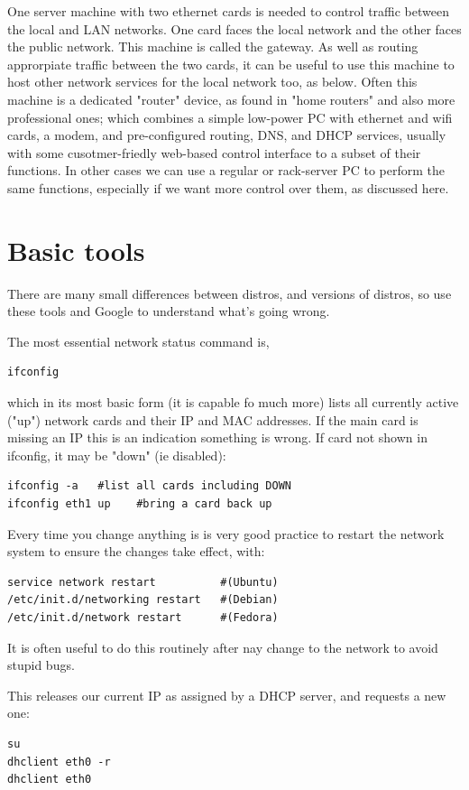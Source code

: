 \documentclass[oneside,english]{scrbook}
\begin{document}
One server machine with two ethernet cards is needed to control traffic
between the local and LAN networks. One card faces the local network and the other faces the public network.  This machine is called the gateway.
As well as routing approrpiate traffic between the two cards, it can be useful to use this machine to host other network services for the local network too, as below.  Often this machine is a dedicated "router" device, as found in "home routers" and also more professional ones; which combines a simple low-power PC with ethernet and wifi cards, a modem, and pre-configured routing, DNS, and DHCP services, usually with some cusotmer-friedly web-based control interface to a subset of their functions. In other cases we can use a regular or rack-server PC to perform the same functions, especially if we want more control over them, as discussed here.

\section{Basic tools}

There are many small differences between distros, and versions of
distros, so use these tools and Google to understand what's going
wrong.

The most essential network status command is,
\begin{lstlisting}
ifconfig
\end{lstlisting}
which in its most basic form (it is capable fo much more) lists all currently active ("up") network cards and their IP and MAC addresses.  If the main card is missing an IP this is an indication something is wrong.  If card not shown in ifconfig, it may be "down" (ie disabled): 
\begin{lstlisting}
ifconfig -a   #list all cards including DOWN 
ifconfig eth1 up    #bring a card back up
\end{lstlisting}

Every time you change anything is is very good practice to restart the network system to ensure the changes take effect, with:

\begin{lstlisting}
service network restart			 #(Ubuntu)
/etc/init.d/networking restart   #(Debian)
/etc/init.d/network restart      #(Fedora)
\end{lstlisting}
It is often useful to do this routinely after nay change to the network to avoid stupid bugs.

This releases our current IP as assigned by a DHCP server, and requests a new one:
\begin{lstlisting}
su
dhclient eth0 -r
dhclient eth0
\end{lstlisting}
\end{document}
